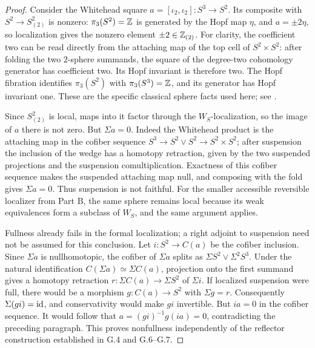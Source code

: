 \begin{proof}
Consider the Whitehead square $a=[\iota_2,\iota_2]:S^3\to S^2$. Its composite with $S^2\to S^2_{(2)}$ is nonzero: $\pi_3(S^2)=\mathbb Z$ is generated by the Hopf map $\eta$, and $a=\pm2\eta$, so localization gives the nonzero element $\pm2\in\mathbb Z_{(2)}$. For clarity, the coefficient two can be read directly from the attaching map of the top cell of $S^2\times S^2$: after folding the two $2$-sphere summands, the square of the degree-two cohomology generator has coefficient two. Its Hopf invariant is therefore two. The Hopf fibration identifies $\pi_3(S^2)$ with $\pi_3(S^3)=\mathbb Z$, and its generator has Hopf invariant one. These are the specific classical sphere facts used here; see \cite[Example 4.51, pp.~380--381, and the proof of Corollary 4J.4, p.~474]{FGHHatcher2002}.

Since $S^2_{(2)}$ is local, maps into it factor through the $W_S$-localization, so the image of $a$ there is not zero. But $\Sigma a=0$. Indeed the Whitehead product is the attaching map in the cofiber sequence $S^3\to S^2\vee S^2\to S^2\times S^2$; after suspension the inclusion of the wedge has a homotopy retraction, given by the two suspended projections and the suspension comultiplication. Exactness of this cofiber sequence makes the suspended attaching map null, and composing with the fold gives $\Sigma a=0$. Thus suspension is not faithful. For the smaller accessible reversible localizer from Part B, the same sphere remains local because its weak equivalences form a subclass of $W_S$, and the same argument applies.

Fullness already fails in the formal localization; a right adjoint to suspension need not be assumed for this conclusion. Let $i:S^2\to C(a)$ be the cofiber inclusion. Since $\Sigma a$ is nullhomotopic, the cofiber of $\Sigma a$ splits as $\Sigma S^2\vee\Sigma^2 S^3$. Under the natural identification $C(\Sigma a)\simeq\Sigma C(a)$, projection onto the first summand gives a homotopy retraction $r:\Sigma C(a)\to\Sigma S^2$ of $\Sigma i$. If localized suspension were full, there would be a morphism $g:C(a)\to S^2$ with $\Sigma g=r$. Consequently $\Sigma(gi)=\mathrm{id}$, and conservativity would make $gi$ invertible. But $ia=0$ in the cofiber sequence. It would follow that $a=(gi)^{-1}g(ia)=0$, contradicting the preceding paragraph. This proves nonfullness independently of the reflector construction established in G.4 and G.6--G.7.


\end{proof}
